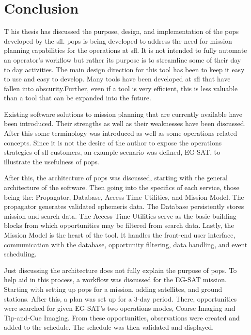 \glsresetall{} 

\chapter{Conclusion}\label{chap:conclusion}

\lettrine[lines=2, findent=0pt, nindent=5pt]{T}{} his thesis has discussed
the purpose, design, and implementation of the \gls{pops} developed by the
\gls{sfl}. \gls{pops} is being developed to address the need for mission
planning capabilities for the operations at \gls{sfl}. It is not intended to
fully automate an operator's workflow but rather its purpose is to streamline
some of their day to day activities. The main design direction for this tool
has been to keep it easy to use and easy to develop. Many tools have been
developed at \gls{sfl} that have fallen into obscurity.Further, even if a tool is
very efficient, this is less valuable than a tool that can be expanded into the
future. 

Existing software solutions to mission planning that are currently available
have been introduced. Their strengths as well as their weaknesses have been
discussed. After this some terminology was introduced as well as some
operations related concepts. Since it is not the desire of the author to expose
the operations strategies of \gls{sfl} customers, an example scenario was
defined, EG-SAT, to illustrate the usefulness of \gls{pops}.

After this, the architecture of \gls{pops} was discussed, starting with the
general architecture of the software. Then going into the specifics of each
service, those being the: Propagator, Database, Access Time Utilities, and
Mission Model. The propagator generates validated ephemeris data. The Database
persistently stores mission and search data. The Access Time Utilities serve as
the basic building blocks from which opportunities may be filtered from search
data. Lastly, the Mission Model is the heart of the tool.  It handles the
front-end user interface, communication with the database, opportunity
filtering, data handling, and event scheduling.

Just discussing the architecture does not fully explain the purpose of
\gls{pops}. To help aid in this process, a workflow was discussed for the
EG-SAT mission. Starting with setting up \gls{pops} for a mission, adding
satellites, and ground stations. After this, a plan was set up for a 3-day
period. There, opportunities were searched for given EG-SAT's two operations
modes, Coarse Imaging and Tip-and-Cue Imaging. From these opportunities,
observations were created and added to the schedule. The schedule was then
validated and displayed.  

